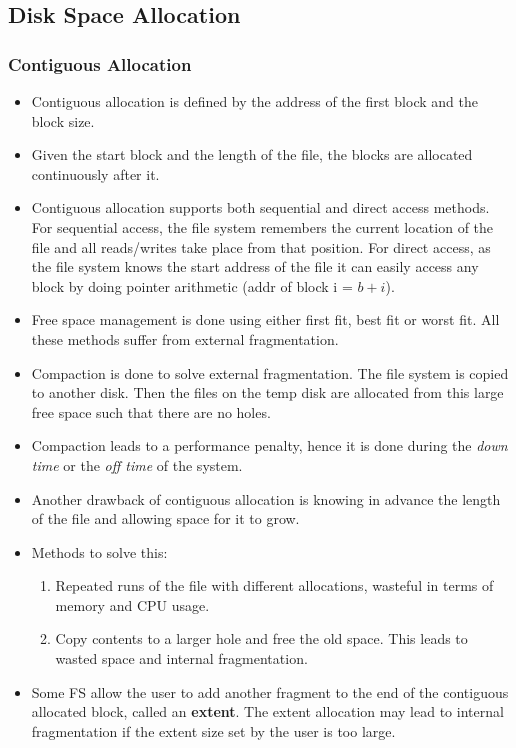 \documentclass{article}
\theoremstyle{plain}
\theoremstyle{definition}
\begin{document}
\subsection{Disk Space Allocation}

\subsubsection{Contiguous Allocation}
\begin{itemize}

    \item Contiguous allocation is defined by the address of the first block and the block size. 
    
    \item Given the start block and the length of the file, the blocks are allocated continuously after it. 
    
    \item Contiguous allocation supports both sequential and direct access methods. For sequential access, the file system remembers the current location of the file and all reads/writes take place from that position. For direct access, as the file system knows the start address of the file it can easily access any block by doing pointer arithmetic (addr of block i = $b+i$).
    
    \item Free space management is done using either first fit, best fit or worst fit. All these methods suffer from external fragmentation. 
    
    \item Compaction is done to solve external fragmentation. The file system is copied to another disk. Then the files on the temp disk are allocated from this large free space such that there are no holes. 
    
    \item Compaction leads to a performance penalty, hence it is done during the \textit{down time} or the \textit{off time} of the system. 
    
    \item Another drawback of contiguous allocation is knowing in advance the length of the file and allowing space for it to grow. 
    
    \item Methods to solve this:
    \begin{enumerate}
        \item Repeated runs of the file with different allocations, wasteful in terms of memory and CPU usage. 
        
        \item Copy contents to a larger hole and free the old space. This leads to wasted space and internal fragmentation. 
    \end{enumerate}
    
    \item Some FS allow the user to add another fragment to the end of the contiguous allocated block, called an \textbf{extent}. The extent allocation may lead to internal fragmentation if the extent size set by the user is too large.
\end{itemize}
\end{document}
